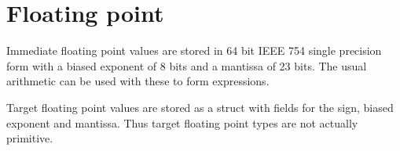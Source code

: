 


    \section{Floating point}
    
        Immediate floating point values are stored in 64 bit IEEE 754 single
        precision form with a biased exponent of 8 bits and a mantissa of 23
        bits. The usual arithmetic can be used with these to form expressions.
             
        Target floating point values are stored as a struct with fields for the
        sign, biased exponent and mantissa. Thus target floating point types
        are not actually primitive.
        
